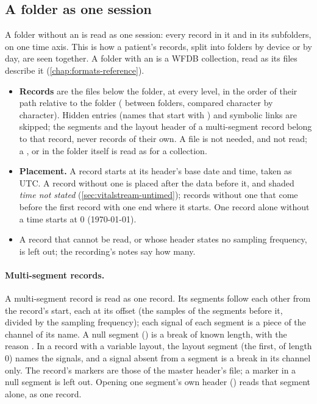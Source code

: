 \subsection{A folder as one session}
\label{sec:vitalstream-session}

A folder without an  is read as one session: every record in it and in its
subfolders, on one time axis. This is how a patient's records, split into folders by device or by
day, are seen together. A folder with an  is a WFDB collection, read as its files
describe it (\cref{chap:formats-reference}).

\begin{itemize}
\item \textbf{Records} are the  files below the folder, at every level, in the order of
  their path relative to the folder (\code{/} between folders, compared character by character).
  Hidden entries (names that start with ) and symbolic links are skipped; the segments and
  the layout header of a multi-segment record belong to that record, never records of their own.
  A  file is not needed, and not read; a ,  or
   in the folder itself is read as for a collection.
\item \textbf{Placement.} A record starts at its header's base date and time, taken as UTC. A
  record without one is placed after the data before it, and shaded \emph{time not stated}
  (\cref{sec:vitalstream-untimed}); records without one that come before the first record with
  one end where it starts. One record alone without a time starts at 0 (1970-01-01).
\item A record that cannot be read, or whose header states no sampling frequency, is left out;
  the recording's notes say how many.
\end{itemize}

\paragraph{Multi-segment records.} A multi-segment record is read as one record. Its segments
follow each other from the record's start, each at its offset (the samples of the segments
before it, divided by the sampling frequency); each signal of each segment is a piece of the
channel of its name. A null segment (\code{\textasciitilde}) is a break of known length, with
the reason . In a record with a variable layout, the layout segment (the first,
of length 0) names the signals, and a signal absent from a segment is a break in its channel
only. The record's markers are those of the master header's  file; a marker in a null
segment is left out. Opening one segment's own header () reads that segment
alone, as one record.

